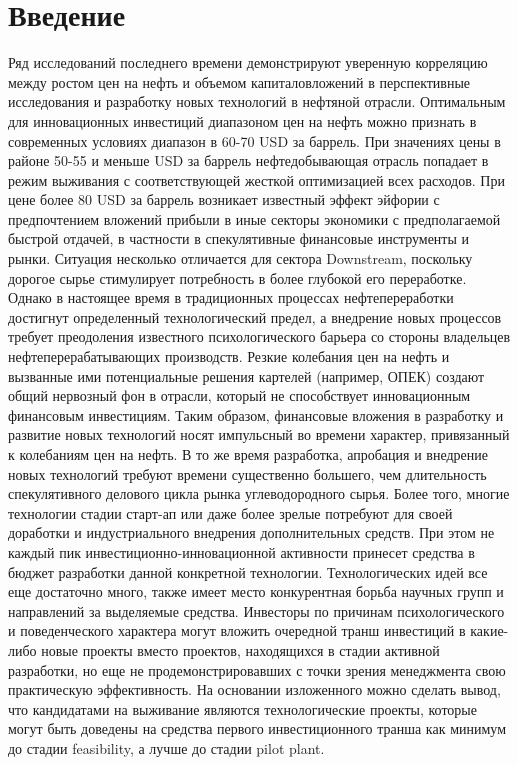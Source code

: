\section{Введение}  

Ряд исследований последнего времени демонстрируют уверенную корреляцию между ростом цен на нефть и объемом капиталовложений в перспективные исследования и разработку новых технологий в нефтяной отрасли.
Оптимальным для инновационных инвестиций диапазоном цен на нефть можно признать в современных условиях диапазон в 60-70 USD за баррель.
При значениях цены в районе 50-55 и меньше USD за баррель нефтедобывающая отрасль попадает в режим выживания с соответствующей жесткой оптимизацией всех расходов.
При цене более 80 USD за баррель возникает известный эффект эйфории с предпочтением вложений прибыли в иные секторы экономики с предполагаемой быстрой отдачей, в частности в спекулятивные финансовые инструменты и рынки.
Ситуация несколько отличается для сектора Downstream, поскольку дорогое сырье стимулирует потребность в более глубокой его переработке.
Однако в настоящее время в традиционных процессах нефтепереработки достигнут определенный технологический предел, а внедрение новых процессов требует преодоления известного психологического барьера со стороны владельцев нефтеперерабатывающих производств.
Резкие колебания цен на нефть и вызванные ими потенциальные решения картелей (например, ОПЕК) создают общий нервозный фон в отрасли, который не способствует инновационным финансовым инвестициям.
Таким образом, финансовые вложения в разработку и развитие новых технологий носят импульсный во времени характер, привязанный к колебаниям цен на нефть.
В то же время разработка, апробация и внедрение новых технологий требуют времени существенно большего, чем длительность спекулятивного делового цикла рынка углеводородного сырья.
Более того, многие технологии стадии старт-ап или даже более зрелые потребуют для своей доработки и индустриального внедрения дополнительных средств.
При этом не каждый пик инвестиционно-инновационной активности принесет средства в бюджет разработки данной конкретной технологии.
Технологических идей все еще достаточно много, также имеет место конкурентная борьба научных групп и направлений за выделяемые средства.
Инвесторы по причинам психологического и поведенческого характера могут вложить очередной транш инвестиций в какие-либо новые проекты вместо проектов, находящихся в стадии активной разработки, но еще не продемонстрировавших с точки зрения менеджмента свою практическую эффективность.
На основании изложенного можно сделать вывод, что кандидатами на выживание являются технологические проекты, которые могут быть доведены на средства первого инвестиционного транша как минимум до стадии feasibility, а лучше до стадии pilot plant.

